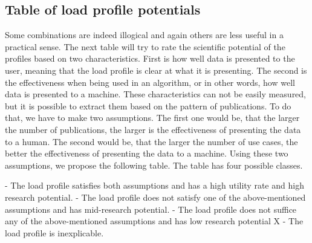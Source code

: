 \subsection{Table of load profile potentials} \label{subsec:potential}

Some combinations are indeed illogical and again others are less useful in a practical sense.
The next table will try to rate the scientific potential of the profiles based on two characteristics. 
First is how well data is presented to the user,
meaning that the load profile is clear at what it is presenting.
The second is the effectiveness when being used in an algorithm, or in other words, how well data is presented to a machine. 
These characteristics can not be easily measured,
but it is possible to extract them based on the pattern of publications.
To do that, we have to make two assumptions.
The first one would be, that the larger the number of publications, the larger is the effectiveness of presenting the data to a human.
The second would be, that the larger the number of use cases, the better the effectiveness of presenting the data to a machine.
Using these two assumptions, we propose the following table. 
The table has four possible classes. 

\begin{outline} 
 - The load profile satisfies both assumptions and has a high utility rate and high research potential. 
 - The load profile does not satisfy one of the above-mentioned assumptions and has mid-research potential.
 - The load profile does not suffice any of the above-mentioned assumptions and has low research potential
\1 X - The load profile is inexplicable.
\end{outline}

